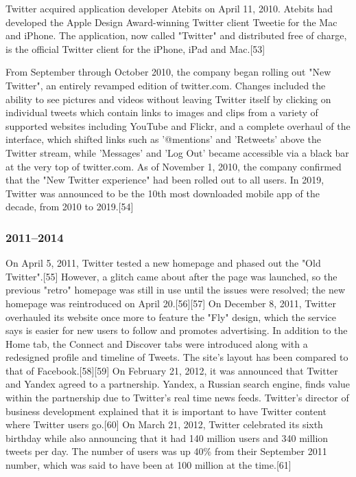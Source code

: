 \documentclass[12pt]{article}
\begin{document}
Twitter acquired application developer Atebits on April 11, 2010. Atebits had developed the Apple Design Award-winning Twitter client Tweetie for the Mac and iPhone. The application, now called "Twitter" and distributed free of charge, is the official Twitter client for the iPhone, iPad and Mac.[53]

From September through October 2010, the company began rolling out "New Twitter", an entirely revamped edition of twitter.com. Changes included the ability to see pictures and videos without leaving Twitter itself by clicking on individual tweets which contain links to images and clips from a variety of supported websites including YouTube and Flickr, and a complete overhaul of the interface, which shifted links such as '@mentions' and 'Retweets' above the Twitter stream, while 'Messages' and 'Log Out' became accessible via a black bar at the very top of twitter.com. As of November 1, 2010, the company confirmed that the "New Twitter experience" had been rolled out to all users. In 2019, Twitter was announced to be the 10th most downloaded mobile app of the decade, from 2010 to 2019.[54] 






\subsubsection{2011–2014}




On April 5, 2011, Twitter tested a new homepage and phased out the "Old Twitter".[55] However, a glitch came about after the page was launched, so the previous "retro" homepage was still in use until the issues were resolved; the new homepage was reintroduced on April 20.[56][57] On December 8, 2011, Twitter overhauled its website once more to feature the "Fly" design, which the service says is easier for new users to follow and promotes advertising. In addition to the Home tab, the Connect and Discover tabs were introduced along with a redesigned profile and timeline of Tweets. The site's layout has been compared to that of Facebook.[58][59] On February 21, 2012, it was announced that Twitter and Yandex agreed to a partnership. Yandex, a Russian search engine, finds value within the partnership due to Twitter's real time news feeds. Twitter's director of business development explained that it is important to have Twitter content where Twitter users go.[60] On March 21, 2012, Twitter celebrated its sixth birthday while also announcing that it had 140 million users and 340 million tweets per day. The number of users was up 40\% from their September 2011 number, which was said to have been at 100 million at the time.[61]
\end{document}
